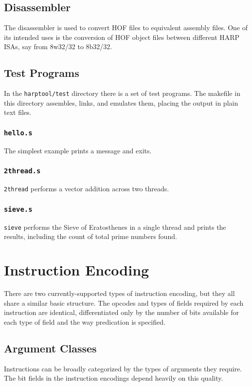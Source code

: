 \documentclass[10pt,letterpaper]{article}
\begin{document}
\subsection{Disassembler}
The disassembler is used to convert HOF files to equivalent assembly files.
One of its intended uses is the conversion of HOF object files between different HARP ISAs, say from 8w32/32 to 8b32/32.

\subsection{Test Programs}
In the \texttt{harptool/test} directory there is a set of test programs.
The makefile in this directory assembles, links, and emulates them, placing the output in plain text files.

\subsubsection{\texttt{hello.s}}
The simplest example prints a message and exits.

\subsubsection{\texttt{2thread.s}}
\texttt{2thread} performs a vector addition across two threads.

\subsubsection{\texttt{sieve.s}}
\texttt{sieve} performs the Sieve of Eratosthenes in a single thread and prints the results, including the count of total prime numbers found.

\section{Instruction Encoding}
There are two currently-supported types of instruction encoding, but they all share a similar basic structure.
The opcodes and types of fields required by each instruction are identical, differentiated only by the number of bits available for each type of field and the way predication is specified.

\subsection{Argument Classes}
Instructions can be broadly categorized by the types of arguments they require.
The bit fields in the instruction encodings depend heavily on this quality.
\end{document}
